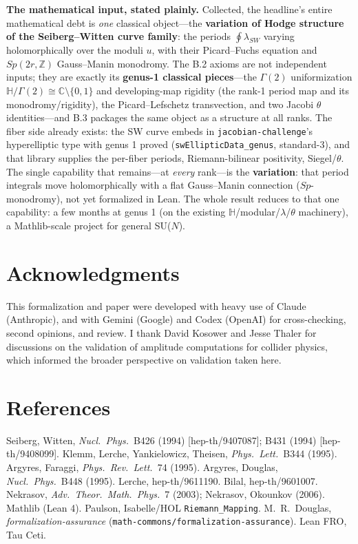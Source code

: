 \documentclass[11pt]{article}
\newcommand{\code}[1]{\texttt{#1}}
\begin{document}
\medskip
\noindent\textbf{The mathematical input, stated plainly.} Collected, the headline's entire
mathematical debt is \emph{one} classical object---the \textbf{variation of Hodge structure of the
Seiberg--Witten curve family}: the periods $\oint \lambda_{SW}$ varying holomorphically over the
moduli $u$, with their Picard--Fuchs equation and $Sp(2r,\mathbb{Z})$ Gauss--Manin monodromy. The
B.2 axioms are not independent inputs; they are exactly its \textbf{genus-1 classical pieces}---the
$\Gamma(2)$ uniformization $\mathbb{H}/\Gamma(2)\cong\mathbb{C}\setminus\{0,1\}$ and developing-map
rigidity (the rank-1 period map and its monodromy/rigidity), the Picard--Lefschetz transvection,
and two Jacobi $\theta$ identities---and B.3 packages the same object as a structure at all ranks.
The fiber side already exists: the SW curve embeds in \code{jacobian-challenge}'s hyperelliptic
type with genus 1 proved (\code{swEllipticData\_genus}, standard-3), and that library supplies the
per-fiber periods, Riemann-bilinear positivity, Siegel/$\theta$. The single capability that
remains---at \emph{every} rank---is the \textbf{variation}: that period integrals move
holomorphically with a flat Gauss--Manin connection ($Sp$-monodromy), not yet formalized in Lean.
The whole result reduces to that one capability: a few months at genus 1 (on the existing
$\mathbb{H}$/modular/$\lambda$/$\theta$ machinery), a Mathlib-scale project for general SU($N$).

\section*{Acknowledgments}
This formalization and paper were developed with heavy use of Claude (Anthropic), and with
Gemini (Google) and Codex (OpenAI) for cross-checking, second opinions, and review. I thank
David Kosower and Jesse Thaler for discussions on the validation of amplitude computations for
collider physics, which informed the broader perspective on validation taken here.

\section*{References}
\small
\noindent
Seiberg, Witten, \emph{Nucl.\ Phys.}\ B426 (1994) [hep-th/9407087]; B431 (1994)
[hep-th/9408099].
Klemm, Lerche, Yankielowicz, Theisen, \emph{Phys.\ Lett.}\ B344 (1995).
Argyres, Faraggi, \emph{Phys.\ Rev.\ Lett.}\ 74 (1995).
Argyres, Douglas, \emph{Nucl.\ Phys.}\ B448 (1995).
Lerche, hep-th/9611190.
Bilal, hep-th/9601007.
Nekrasov, \emph{Adv.\ Theor.\ Math.\ Phys.}\ 7 (2003); Nekrasov, Okounkov (2006).
Mathlib (Lean 4).
Paulson, Isabelle/HOL \code{Riemann\_Mapping}.
M.\ R.\ Douglas, \emph{formalization-assurance} (\code{math-commons/\discretionary{}{}{}formalization-assurance}).
Lean FRO, Tau Ceti.
\end{document}
